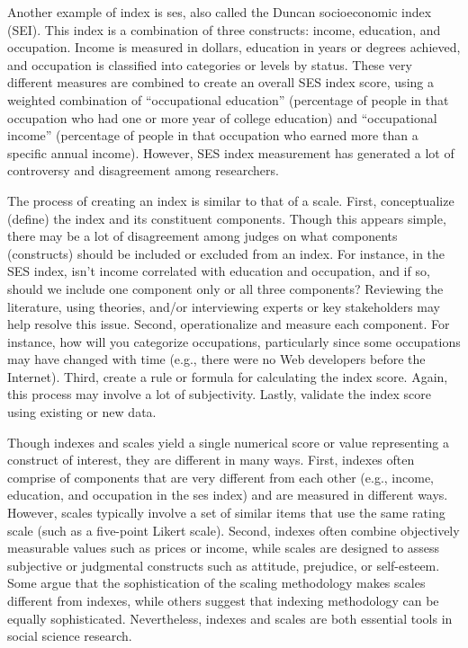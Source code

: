 Another example of index is \gls{ses}, also called the Duncan socioeconomic index (SEI). This index is a combination of three constructs: income, education, and occupation. Income is measured in dollars, education in years or degrees achieved, and occupation is classified into categories or levels by status. These very different measures are combined to create an overall SES index score, using a weighted combination of ``occupational education'' (percentage of people in that occupation who had one or more year of college education) and ``occupational income'' (percentage of people in that occupation who earned more than a specific annual income). However, SES index measurement has generated a lot of controversy and disagreement among researchers.

The process of creating an index is similar to that of a scale. First, conceptualize (define) the index and its constituent components. Though this appears simple, there may be a lot of disagreement among judges on what components (constructs) should be included or excluded from an index. For instance, in the SES index, isn't income correlated with education and occupation, and if so, should we include one component only or all three components? Reviewing the literature, using theories, and/or interviewing experts or key stakeholders may help resolve this issue. Second, operationalize and measure each component. For instance, how will you categorize occupations, particularly since some occupations may have changed with time (e.g., there were no Web developers before the Internet). Third, create a rule or formula for calculating the index score. Again, this process may involve a lot of subjectivity. Lastly, validate the index score using existing or new data.

Though indexes and scales yield a single numerical score or value representing a construct of interest, they are different in many ways. First, indexes often comprise of components that are very different from each other (e.g., income, education, and occupation in the \gls{ses} index) and are measured in different ways. However, scales typically involve a set of similar items that use the same rating scale (such as a five-point Likert scale). Second, indexes often combine objectively measurable values such as prices or income, while scales are designed to assess subjective or judgmental constructs such as attitude, prejudice, or self-esteem. Some argue that the sophistication of the scaling methodology makes scales different from indexes, while others suggest that indexing methodology can be equally sophisticated. Nevertheless, indexes and scales are both essential tools in social science research.

